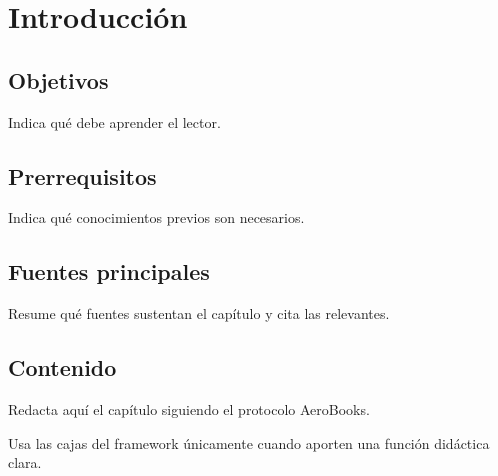 \chapter{Introducción}

\section{Objetivos}
Indica qué debe aprender el lector.

\section{Prerrequisitos}
Indica qué conocimientos previos son necesarios.

\section{Fuentes principales}
Resume qué fuentes sustentan el capítulo y cita las relevantes.

\section{Contenido}
Redacta aquí el capítulo siguiendo el protocolo AeroBooks.

\begin{intuitionbox}
Usa las cajas del framework únicamente cuando aporten una función didáctica clara.
\end{intuitionbox}
